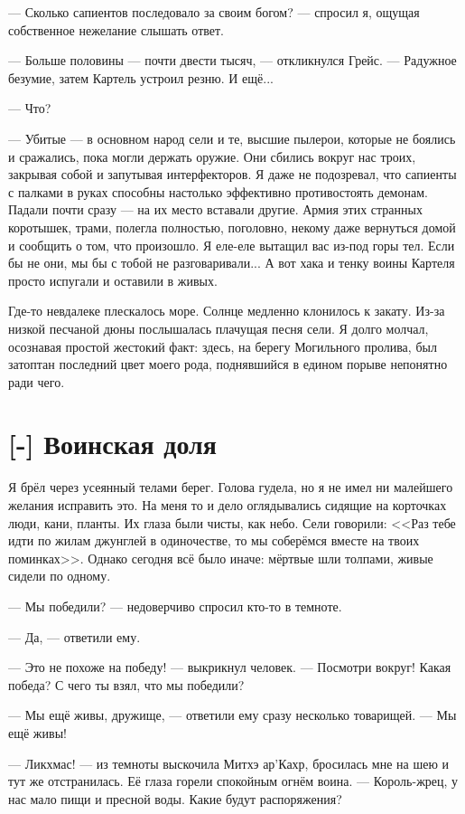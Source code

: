 --- Сколько сапиентов последовало за своим богом? --- спросил я, ощущая собственное нежелание слышать ответ.

--- Больше половины --- почти двести тысяч, --- откликнулся Грейс.
--- Радужное безумие, затем Картель устроил резню.
И ещё...

--- Что?

--- Убитые --- в основном народ сели и те, высшие пылерои, которые не боялись и сражались, пока могли держать оружие.
Они сбились вокруг нас троих, закрывая собой и запутывая интерфекторов.
Я даже не подозревал, что сапиенты с палками в руках способны настолько эффективно противостоять демонам.
Падали почти сразу --- на их место вставали другие.
Армия этих странных коротышек, трами, полегла полностью, поголовно, некому даже вернуться домой и сообщить о том, что произошло.
Я еле-еле вытащил вас из-под горы тел.
Если бы не они, мы бы с тобой не разговаривали...
А вот хака и тенку воины Картеля просто испугали и оставили в живых.

Где-то невдалеке плескалось море.
Солнце медленно клонилось к закату.
Из-за низкой песчаной дюны послышалась плачущая песня сели.
Я долго молчал, осознавая простой жестокий факт: здесь, на берегу Могильного пролива, был затоптан последний цвет моего рода, поднявшийся в едином порыве непонятно ради чего.

\section{[-] Воинская доля}

Я брёл через усеянный телами берег.
Голова гудела, но я не имел ни малейшего желания исправить это.
На меня то и дело оглядывались сидящие на корточках люди, кани, планты.
Их глаза были чисты, как небо.
Сели говорили: <<Раз тебе идти по жилам джунглей в одиночестве, то мы соберёмся вместе на твоих поминках>>.
Однако сегодня всё было иначе: мёртвые шли толпами, живые сидели по одному.

--- Мы победили? --- недоверчиво спросил кто-то в темноте.

--- Да, --- ответили ему.

--- Это не похоже на победу! --- выкрикнул человек.
--- Посмотри вокруг!
Какая победа?
С чего ты взял, что мы победили?

--- Мы ещё живы, дружище, --- ответили ему сразу несколько товарищей.
--- Мы ещё живы!

--- Ликхмас! --- из темноты выскочила Митхэ ар'Кахр, бросилась мне на шею и тут же отстранилась.
Её глаза горели спокойным огнём воина.
--- Король-жрец, у нас мало пищи и пресной воды.
Какие будут распоряжения?

